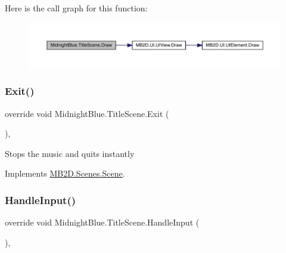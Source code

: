 Here is the call graph for this function\+:
\nopagebreak
\begin{figure}[H]
\begin{center}
\leavevmode
\includegraphics[width=350pt]{class_midnight_blue_1_1_title_scene_a03fa806a36226ec5fd0ce09870109c18_cgraph}
\end{center}
\end{figure}
\hypertarget{class_midnight_blue_1_1_title_scene_aed29e37e9f849cc8f8443bae057a8eb8}{}\label{class_midnight_blue_1_1_title_scene_aed29e37e9f849cc8f8443bae057a8eb8} 
\subsubsection{\texorpdfstring{Exit()}{Exit()}}
{\footnotesize\ttfamily override void Midnight\+Blue.\+Title\+Scene.\+Exit (\begin{DoxyParamCaption}{ }\end{DoxyParamCaption})\hspace{0.3cm}{\ttfamily [inline]}, {\ttfamily [virtual]}}



Stops the music and quits instantly 



Implements \hyperlink{class_m_b2_d_1_1_scenes_1_1_scene_a099b79e16d23b67349847999d2336813}{M\+B2\+D.\+Scenes.\+Scene}.

\hypertarget{class_midnight_blue_1_1_title_scene_a54dc02f150eb90dac2fcc6e37a077723}{}\label{class_midnight_blue_1_1_title_scene_a54dc02f150eb90dac2fcc6e37a077723} 
\subsubsection{\texorpdfstring{Handle\+Input()}{HandleInput()}}
{\footnotesize\ttfamily override void Midnight\+Blue.\+Title\+Scene.\+Handle\+Input (\begin{DoxyParamCaption}{ }\end{DoxyParamCaption})\hspace{0.3cm}{\ttfamily [inline]}, {\ttfamily [virtual]}}




